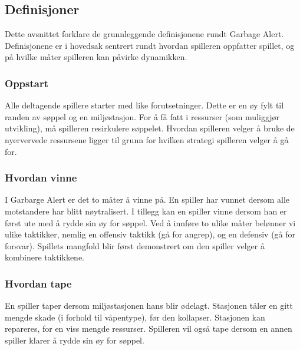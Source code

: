 \subsection{Definisjoner}
Dette avsnittet forklare de grunnleggende definisjonene rundt Garbage
Alert. Definisjonene er i hovedsak sentrert rundt hvordan spilleren
oppfatter spillet, og på hvilke måter spilleren kan påvirke dynamikken.
\subsubsection{Oppstart}
Alle deltagende spillere starter med like forutsetninger. Dette er en øy
fylt til randen av søppel og en miljøstasjon. For å få fatt i ressurser
(som muliggjør utvikling), må spilleren resirkulere søppelet.  Hvordan
spilleren velger å bruke de nyervervede ressursene ligger til grunn for
hvilken strategi spilleren velger å gå for.
\subsubsection{Hvordan vinne}
I Garbarge Alert er det to måter å vinne på. En spiller har vunnet
dersom alle motstandere har blitt nøytralisert. I tillegg kan en spiller
vinne dersom han er først ute med å rydde sin øy for søppel.  Ved å
innføre to ulike måter belønner vi ulike taktikker, nemlig en offensiv
taktikk (gå for angrep), og en defensiv (gå for forsvar).  Spillets
mangfold blir først demonstrert om den spiller velger å kombinere
taktikkene.
\subsubsection{Hvordan tape}
En spiller taper dersom miljøstasjonen hans blir ødelagt. Stasjonen
tåler en gitt mengde skade (i forhold til våpentype), før den kollapser.
Stasjonen kan repareres, for en viss mengde ressurser.
Spilleren vil også tape dersom en annen spiller klarer å rydde sin øy
for søppel.
